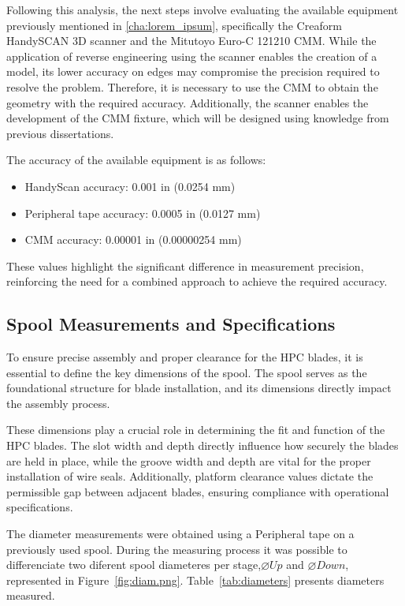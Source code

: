 Following this analysis, the next steps involve evaluating the available equipment previously mentioned in \ref{cha:lorem_ipsum}, specifically the Creaform HandySCAN 3D scanner and the Mitutoyo Euro-C 121210 \gls{CMM}. While the application of reverse engineering using the scanner enables the creation of a model, its lower accuracy on edges may compromise the precision required to resolve the problem. Therefore, it is necessary to use the CMM to obtain the geometry with the required accuracy. Additionally, the scanner enables the development of the CMM fixture, which will be designed using knowledge from previous dissertations.

The accuracy of the available equipment is as follows:  

\begin{itemize}
    \item HandyScan accuracy: 0.001 in (0.0254 mm)
    \item Peripheral tape accuracy: 0.0005 in (0.0127 mm)
    \item CMM accuracy: 0.00001 in (0.00000254 mm)
\end{itemize}

These values highlight the significant difference in measurement precision, reinforcing the need for a combined approach to achieve the required accuracy.

\subsection{Spool Measurements and Specifications}
\label{subsec:spool_measurements}

To ensure precise assembly and proper clearance for the HPC blades, it is essential to define the key dimensions of the spool. The spool serves as the foundational structure for blade installation, and its dimensions directly impact the assembly process. 

These dimensions play a crucial role in determining the fit and function of the HPC blades. The slot width and depth directly influence how securely the blades are held in place, while the groove width and depth are vital for the proper installation of wire seals.
Additionally, platform clearance values dictate the permissible gap between adjacent blades, ensuring compliance with operational specifications.

The diameter measurements were obtained using a Peripheral tape on a previously used spool. 
During the measuring process it was possible to differenciate two diferent spool diameteres per stage,$\varnothing Up$ and $\varnothing Down$, represented in Figure~\ref{fig:diam.png}.
Table~\ref{tab:diameters} presents diameters measured.

